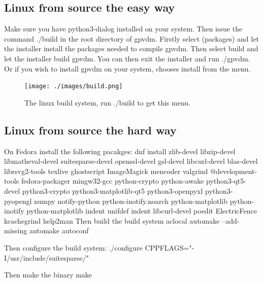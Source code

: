 \documentclass[11pt]{article}
\begin{document}
\subsection{Linux from source the easy way}
Make sure you have python3-dialog installed on your system.  Then issue the command ./build in the root directory of gpvdm.  Firstly select (packages) and let the installer install the packages needed to compile gpvdm.  Then select build and let the installer build gpvdm.  You can then exit the installer and run ./gpvdm.  Or if you wish to install gpvdm on your system, chooses install from the menu.

\begin{figure}[ht!]
\centering
\texttt{[image: ./images/build.png]}
\caption{The linux build system, run ./build to get this menu.  }
\label{fig:build}
\end{figure}


\subsection{Linux from source the hard way}

On Fedora install the following pacakges:\newline
dnf install zlib-devel libzip-devel libmatheval-devel suitesparse-devel openssl-devel gsl-devel libcurl-devel blas-devel librsvg2-tools texlive ghostscript ImageMagick mencoder valgrind @development-tools fedora-packager mingw32-gcc python-crypto python-awake python3-qt5-devel python3-crypto python3-matplotlib-qt5 python3-openpyxl python3-pyopengl numpy notify-python python-inotify.noarch python-matplotlib python-inotify python-matplotlib indent unifdef indent libcurl-devel poedit ElectricFence kcachegrind help2man\newline
\newline
Then build the build system\newline
aclocal\newline
automake --add-missing\newline
automake\newline
autoconf\newline

Then configure the build system:\newline
./configure CPPFLAGS="-I/usr/include/suitesparse/"\newline

Then make the binary\newline
make\newline
\end{document}
